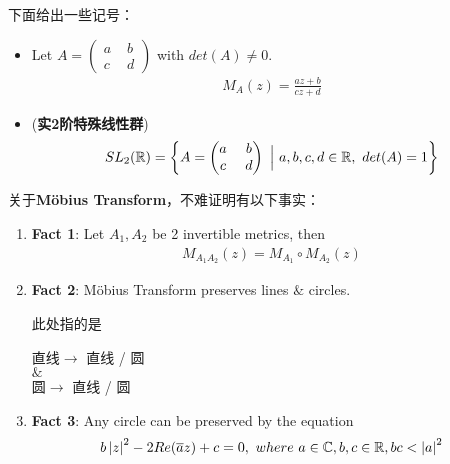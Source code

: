 	\vspace*{4em}
	下面给出一些记号：
	\begin{itemize}
		\item Let $A = \begin{pmatrix}
			a \,\, &b \\
			c \,\, &d
		\end{pmatrix}$ with $det(A) \neq 0$.
		\begin{align}
			M_{A}(z) = \frac{az + b}{cz + d}
		\end{align}
		
		\vspace*{2em}
		
		\item (\textbf{实2阶特殊线性群})
		\begin{align}
			SL_2(\mathbb{R}) = \left\{ A = \begin{pmatrix}
				a \,\, &b \\
				c \,\, &d
			\end{pmatrix} \,\, \Big| \,\, a , b , c , d \in \mathbb{R} , \,\, det(A) = 1 \right\}
		\end{align}
	\end{itemize}
	
	\vspace*{6em}
	关于\textbf{M\"{o}bius Transform}，不难证明有以下事实：
	\begin{enumerate}
		\item \textbf{Fact 1}: Let $A_1 , A_2$ be 2 invertible metrics, then
		\begin{align}
			M_{A_1 A_2}(z) = M_{A_1} \circ M_{A_2}(z)
		\end{align}
		
		\vspace*{2em}
		
		\item \textbf{Fact 2}: M\"{o}bius Transform preserves lines $\&$ circles.
		\begin{rmk}
			此处指的是
			\begin{center}
				直线$\longrightarrow$ 直线 / 圆 \\
				$\&$ \\
				圆$\longrightarrow$ 直线 / 圆
			\end{center}
		\end{rmk}
		
		\vspace*{2em}
		
		\item \textbf{Fact 3}: Any circle can be preserved by the equation
		\begin{align}
			b \left| z \right|^2 - 2 Re(\overline{a}z) + c = 0 , \,\, where \,\, a \in \mathbb{C} , b , c \in \mathbb{R} , bc < \left| a \right|^2
		\end{align}
	\end{enumerate}

